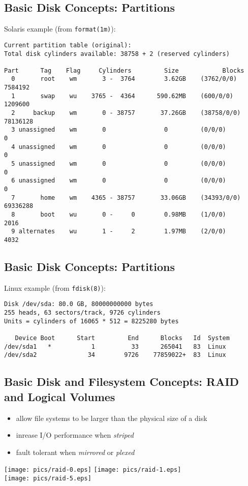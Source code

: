 \documentclass[xga]{xdvislides}
\begin{document}
\subsection{Basic Disk Concepts: Partitions}
Solaris example (from {\tt format(1m)}):
\begin{verbatim}
Current partition table (original):
Total disk cylinders available: 38758 + 2 (reserved cylinders)

Part      Tag    Flag     Cylinders         Size            Blocks
  0       root    wm       3 -  3764        3.62GB    (3762/0/0)   7584192
  1       swap    wu    3765 -  4364      590.62MB    (600/0/0)    1209600
  2     backup    wm       0 - 38757       37.26GB    (38758/0/0) 78136128
  3 unassigned    wm       0                0         (0/0/0)            0
  4 unassigned    wm       0                0         (0/0/0)            0
  5 unassigned    wm       0                0         (0/0/0)            0
  6 unassigned    wm       0                0         (0/0/0)            0
  7       home    wm    4365 - 38757       33.06GB    (34393/0/0) 69336288
  8       boot    wu       0 -     0        0.98MB    (1/0/0)         2016
  9 alternates    wu       1 -     2        1.97MB    (2/0/0)         4032
\end{verbatim}

\subsection{Basic Disk Concepts: Partitions}
Linux example (from {\tt fdisk(8)}):
\begin{verbatim}
Disk /dev/sda: 80.0 GB, 80000000000 bytes
255 heads, 63 sectors/track, 9726 cylinders
Units = cylinders of 16065 * 512 = 8225280 bytes

   Device Boot      Start         End      Blocks   Id  System
/dev/sda1   *           1          33      265041   83  Linux
/dev/sda2              34        9726    77859022+  83  Linux
\end{verbatim}

\subsection{Basic Disk and Filesystem Concepts: RAID and Logical Volumes}
\begin{itemize}
	\item allow file systems to be larger than the physical size of a disk
	\item inrease I/O performance when {\em striped}
	\item fault tolerant when {\em mirrored} or {\em plexed}
\end{itemize}
\vfill
\begin{center}
        \texttt{[image: pics/raid-0.eps]}
        \hspace{.5in}
        \texttt{[image: pics/raid-1.eps]} \\
        \vspace{.2in}
        \texttt{[image: pics/raid-5.eps]}
\end{center}
\vfill
\end{document}
